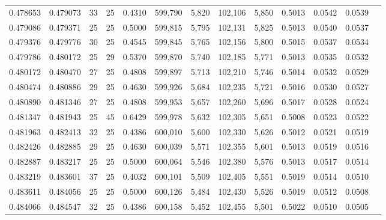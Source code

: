 \begin{tabular}{rrrrrrrrrrrrr}
0.478653 & 0.479073 &    33 &  25 &                                     0.4310 & 599,790 &   5,820 & 102,106 &   5,850 & 0.5013 & 0.0542 & 0.0539 \\
0.479086 & 0.479371 &    25 &  25 &                                     0.5000 & 599,815 &   5,795 & 102,131 &   5,825 & 0.5013 & 0.0540 & 0.0537 \\
0.479376 & 0.479776 &    30 &  25 &                                     0.4545 & 599,845 &   5,765 & 102,156 &   5,800 & 0.5015 & 0.0537 & 0.0534 \\
0.479786 & 0.480172 &    25 &  29 &                                     0.5370 & 599,870 &   5,740 & 102,185 &   5,771 & 0.5013 & 0.0535 & 0.0532 \\
0.480172 & 0.480470 &    27 &  25 &                                     0.4808 & 599,897 &   5,713 & 102,210 &   5,746 & 0.5014 & 0.0532 & 0.0529 \\
0.480474 & 0.480886 &    29 &  25 &                                     0.4630 & 599,926 &   5,684 & 102,235 &   5,721 & 0.5016 & 0.0530 & 0.0527 \\
0.480890 & 0.481346 &    27 &  25 &                                     0.4808 & 599,953 &   5,657 & 102,260 &   5,696 & 0.5017 & 0.0528 & 0.0524 \\
0.481347 & 0.481943 &    25 &  45 &                                     0.6429 & 599,978 &   5,632 & 102,305 &   5,651 & 0.5008 & 0.0523 & 0.0522 \\
0.481963 & 0.482413 &    32 &  25 &                                     0.4386 & 600,010 &   5,600 & 102,330 &   5,626 & 0.5012 & 0.0521 & 0.0519 \\
0.482426 & 0.482885 &    29 &  25 &                                     0.4630 & 600,039 &   5,571 & 102,355 &   5,601 & 0.5013 & 0.0519 & 0.0516 \\
0.482887 & 0.483217 &    25 &  25 &                                     0.5000 & 600,064 &   5,546 & 102,380 &   5,576 & 0.5013 & 0.0517 & 0.0514 \\
0.483219 & 0.483601 &    37 &  25 &                                     0.4032 & 600,101 &   5,509 & 102,405 &   5,551 & 0.5019 & 0.0514 & 0.0510 \\
0.483611 & 0.484056 &    25 &  25 &                                     0.5000 & 600,126 &   5,484 & 102,430 &   5,526 & 0.5019 & 0.0512 & 0.0508 \\
0.484066 & 0.484547 &    32 &  25 &                                     0.4386 & 600,158 &   5,452 & 102,455 &   5,501 & 0.5022 & 0.0510 & 0.0505 \\

\end{tabular}

